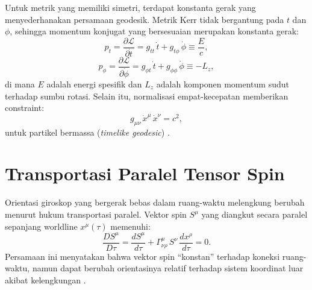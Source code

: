 Untuk metrik yang memiliki simetri, terdapat konstanta gerak yang menyederhanakan persamaan geodesik. Metrik Kerr tidak bergantung pada $t$ dan $\phi$, sehingga momentum konjugat yang bersesuaian merupakan konstanta gerak:
\begin{equation}
    p_t = \frac{\partial\mathcal{L}}{\partial\dot{t}} = g_{tt}\,\dot{t} + g_{t\phi}\,\dot{\phi} \equiv \frac{E}{c},
    \label{eq:const-E}
\end{equation}
\begin{equation}
    p_\phi = \frac{\partial\mathcal{L}}{\partial\dot{\phi}} = g_{\phi t}\,\dot{t} + g_{\phi\phi}\,\dot{\phi} \equiv -L_z,
    \label{eq:const-Lz}
\end{equation}
di mana $E$ adalah energi spesifik dan $L_z$ adalah komponen momentum sudut terhadap sumbu rotasi. Selain itu, normalisasi empat-kecepatan memberikan constraint:
\begin{equation}
    g_{\mu\nu}\,\dot{x}^\mu\,\dot{x}^\nu = c^2,
    \label{eq:normalisasi}
\end{equation}
untuk partikel bermassa (\textit{timelike geodesic}) \parencite{Carroll2004SpacetimeGeometry, Schutz2009FirstCourse}.


\section{Transportasi Paralel Tensor Spin}
\label{sec:transportasi-paralel}

Orientasi giroskop yang bergerak bebas dalam ruang-waktu melengkung berubah menurut hukum transportasi paralel. Vektor spin $S^\mu$ yang diangkut secara paralel sepanjang worldline $x^\mu(\tau)$ memenuhi:
\begin{equation}
    \frac{DS^\mu}{D\tau} = \frac{dS^\mu}{d\tau}
    + \Gamma^\mu_{\nu\rho}\, S^\nu\, \frac{dx^\rho}{d\tau} = 0.
    \label{eq:spin-transport}
\end{equation}
Persamaan ini menyatakan bahwa vektor spin ``konstan'' terhadap koneksi ruang-waktu, namun dapat berubah orientasinya relatif terhadap sistem koordinat luar akibat kelengkungan \parencite{Misner1973Gravitation}.

